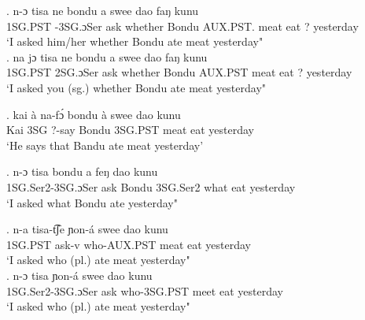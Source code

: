 \documentclass{assets/fieldnotes}
\begin{document}
{\exg. n-ɔ tisa ne bondu a swee dao faŋ kunu\\
1SG.PST -3SG.ɔSer ask whether Bondu AUX.PST. meat eat ? yesterday \\
    `I asked him/her whether Bondu ate meat yesterday" \\

\exg. na jɔ tisa ne bondu a swee dao faŋ kunu\\
1SG.PST 2SG.ɔSer ask whether Bondu AUX.PST meat eat ? yesterday \\
    `I asked you (sg.) whether Bondu ate meat yesterday"\\



\exg. kai à na-fɔ́ bondu à swee dao kunu\\
Kai 3SG ?-say Bondu 3SG.PST meat eat yesterday\\
    `He says that Bandu ate meat yesterday'\\


\exg. n-ɔ tisa bondu a feŋ dao kunu\\
1SG.Ser2-3SG.ɔSer ask Bondu 3SG.Ser2 what eat yesterday\\
    `I asked what Bondu ate yesterday"\\


\exg. n-a tisa-t͡ʃe ɲon-á swee dao kunu\\
1SG.PST ask-v who-AUX.PST meat eat yesterday\\
    `I asked who (pl.) ate meat yesterday" \\ 

\exg. n-ɔ tisa ɲon-á swee dao kunu\\
1SG.Ser2-3SG.ɔSer ask who-3SG.PST meet eat yesterday\\
    `I asked who (pl.) ate meat yesterday" \\ 

}
\end{document}
